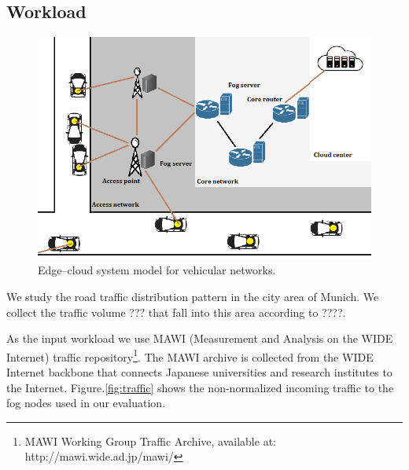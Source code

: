 \documentclass[twocolumn]{article}
\begin{document}

\subsection{Workload} 
\begin{figure}[!htbp]
\centering
\includegraphics[clip, trim=0.0cm 0.2cm 0.5cm 0.3cm, width=\columnwidth]{figures/candid-arch.png}
\caption{Edge–cloud system model for vehicular networks.}
\label{fig:app}
\end{figure}
\par We study the road traffic distribution pattern in the city area of Munich. We collect the traffic volume ??? that fall into this area according to ????.
\par As the input workload we use MAWI (Measurement and Analysis on the WIDE Internet) traffic repository\footnote{MAWI Working Group Traffic Archive, available at: http://mawi.wide.ad.jp/mawi/}. The MAWI archive is collected from the WIDE Internet backbone that connects Japanese universities and research institutes to the Internet.
Figure.\ref{fig:traffic} shows the non-normalized incoming traffic to the fog nodes used in our evaluation. 
\end{document}
